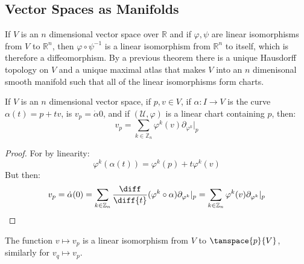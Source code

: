     \subsection{Vector Spaces as Manifolds}
        If $V$ is an $n$ dimensional vector space over $\mathbb{R}$ and if
        $\varphi,\psi$ are linear isomorphisms from $V$ to $\mathbb{R}^{n}$,
        then $\varphi\circ\psi^{\minus{1}}$ is a linear isomorphism from
        $\mathbb{R}^{n}$ to itself, which is therefore a diffeomorphism.
        By a previous theorem there is a unique Hausdorff topology on
        $V$ and a unique maximal atlas that makes $V$ into an $n$
        dimenisonal smooth manifold such that all of the linear isomorphisms
        form charts.
        \begin{theorem}
            If $V$ is an $n$ dimensional vector space, if $p,v\in{V}$, if
            $\alpha:I\rightarrow{V}$ is the curve $\alpha(t)=p+tv$, is
            $v_{p}=\dot{\alpha}{0}$, and if $(\mathcal{U},\varphi)$ is a
            linear chart containing $p$, then:
            \begin{equation}
                v_{p}=\sum_{k\in\mathbb{Z}_{n}}
                    \varphi^{k}(v)\partial_{\varphi^{k}}|_{p}
            \end{equation}
        \end{theorem}
        \begin{proof}
            For by linearity:
            \begin{equation}
                \varphi^{k}(\alpha(t))=\varphi^{k}(p)+t\varphi^{k}(v)
            \end{equation}
            But then:
            \begin{equation}
                v_{p}=\dot{\alpha}(0)
                =\sum_{k\in\mathbb{Z}_{n}}
                    \frac{\diff}{\diff{t}}(\varphi^{k}\circ\alpha)
                    \partial_{\varphi^{k}}|_{p}
                =\sum_{k\in\mathbb{Z}_{n}}\varphi^{k}(v)
                    \partial_{\varphi^{k}}|_{p}
            \end{equation}
        \end{proof}
        The function $v\mapsto{v}_{p}$ is a linear isomorphism from $V$ to
        $\tanspace{p}{V}$, similarly for $v_{q}\mapsto{v}_{p}$.
